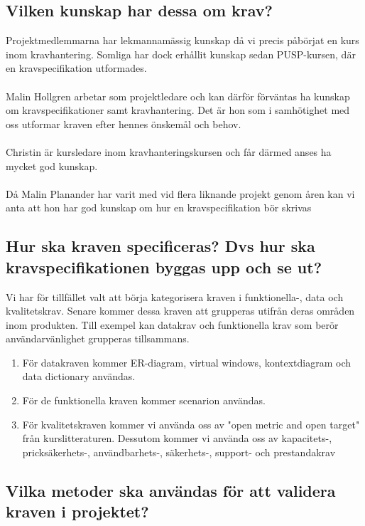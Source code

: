 \documentclass{article}
\begin{document}
\subsection{Vilken kunskap har dessa om krav?}
Projektmedlemmarna har lekmannamässig kunskap då vi precis påbörjat en kurs inom kravhantering. Somliga har dock erhållit kunskap sedan PUSP-kursen, där en kravspecifikation utformades.\\\\
Malin Hollgren arbetar som projektledare och kan därför förväntas ha kunskap om kravspecifikationer samt kravhantering. Det är hon som i samhötighet med oss utformar kraven efter hennes önskemål och behov. \\\\
Christin är kursledare inom kravhanteringskursen och får därmed anses ha mycket god kunskap. \\\\
Då Malin Planander har varit med vid flera liknande projekt genom åren kan vi anta att hon har god kunskap om hur en kravspecifikation bör skrivas

\subsection{Hur ska kraven specificeras? Dvs hur ska kravspecifikationen byggas upp och se ut?}
Vi har för tillfället valt att börja kategorisera kraven i funktionella-, data och kvalitetskrav. Senare kommer dessa kraven att grupperas utifrån deras områden inom produkten. Till exempel kan datakrav och funktionella krav som berör användarvänlighet grupperas tillsammans.
\begin{enumerate}
    \item För datakraven kommer ER-diagram, virtual windows, kontextdiagram och data dictionary användas.
    \item För de funktionella kraven kommer scenarion användas.
    \item För kvalitetskraven kommer vi använda oss av "open metric and open target" från kurslitteraturen. Dessutom kommer vi använda oss av kapacitets-, pricksäkerhets-, användbarhets-, säkerhets-, support- och prestandakrav
\end{enumerate}

\subsection{Vilka metoder ska användas för att validera kraven i projektet?}
\end{document}
